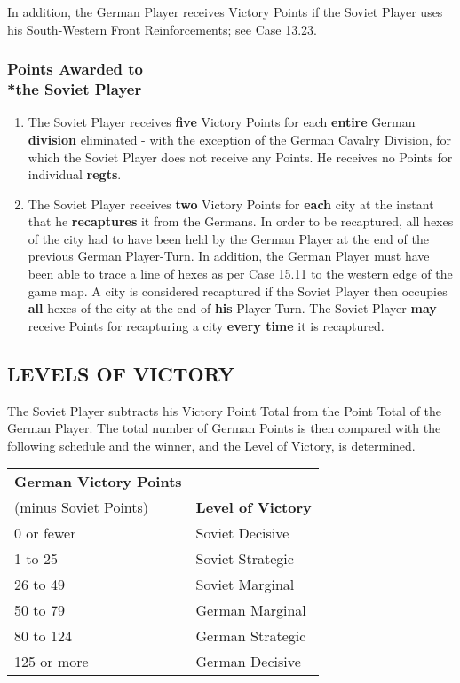 In addition, the German Player receives Victory Points if the Soviet Player uses his South-Western Front Reinforcements; see Case 13.23.

\subsubsection{Points Awarded to\\*the Soviet Player}

\begin{enumerate}
  \item The Soviet Player receives \textbf{five} Victory Points for each \textbf{entire} German \textbf{division} eliminated - with the exception of the German Cavalry Division, for which the Soviet Player does not receive any Points. He receives no Points for individual \textbf{regts}.
  \item The Soviet Player receives \textbf{two} Victory Points for \textbf{each} city at the instant that he \textbf{recaptures} it from the Germans. In order to be recaptured, all hexes of the city had to have been held by the German Player at the end of the previous German Player-Turn. In addition, the German Player must have been able to trace a line of hexes as per Case 15.11 to the western edge of the game map. A city is considered recaptured if the Soviet Player then occupies \textbf{all} hexes of the city at the end of \textbf{his} Player-Turn. The Soviet Player \textbf{may} receive Points for recapturing a city \textbf{every time} it is recaptured.
\end{enumerate}

\subsection{LEVELS OF VICTORY}

The Soviet Player subtracts his Victory Point Total from the Point Total of the German Player. The total number of German Points is then compared with the following schedule and the winner, and the Level of Victory, is determined.

\begin{tabular}{ll}
  \textbf{German Victory Points} &\\
  (minus Soviet Points) & \textbf{Level of Victory}\\
  0 or fewer & Soviet Decisive\\
  1 to 25 & Soviet Strategic\\
  26 to 49 & Soviet Marginal\\
  50 to 79 & German Marginal\\
  80 to 124 & German Strategic\\
  125 or more & German Decisive
\end{tabular}